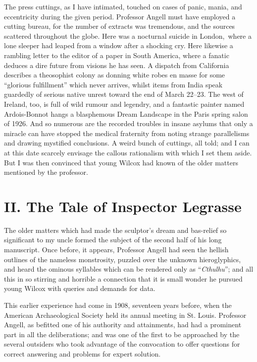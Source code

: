 The press cuttings, as I have intimated, touched on cases of panic,
mania, and eccentricity during the given period. Professor Angell must
have employed a cutting bureau, for the number of extracts was
tremendous, and the sources scattered throughout the globe. Here was a
nocturnal suicide in London,\est\ where a lone sleeper had leaped from a
window after a shocking cry. Here likewise a rambling letter to the
editor of a paper in South America, where a fanatic deduces a dire
future from visions he has seen. A dispatch from California describes a
theosophist colony as donning white robes en masse for some ``glorious
fulfillment'' which never arrives, whilst items from India speak
guardedly of serious native unrest toward the end of March 22--23.
The west of Ireland, too, is full of wild rumour and legendry, and a
fantastic painter named Ardois-Bonnot hangs a blasphemous Dream
Landscape in the Paris spring salon of 1926. And so numerous are the
recorded troubles in insane asylums that only a miracle can have stopped
the medical fraternity from noting strange parallelisms and drawing
mystified conclusions. A weird bunch of cuttings, all told; and I can at
this date scarcely envisage the callous rationalism with which I set
them aside. But I was then convinced that young Wilcox had known of the
older matters mentioned by the professor.

\chapter*{II. The Tale of Inspector Legrasse}

The older matters which had made the sculptor's dream and bas-relief so
significant to my uncle formed the subject of the second half of his
long manuscript. Once before, it appears, Professor Angell had seen the
hellish outlines of the nameless monstrosity, puzzled over the unknown
hieroglyphics, and heard the ominous syllables which can be rendered
only as ``\emph{Cthulhu}''; and all this in so stirring and horrible a
connection that it is small wonder he pursued young Wilcox with queries
and demands for data.

This earlier experience had come in 1908, seventeen years before, when
the American Archaeological Society held its annual meeting in St.
Louis. Professor Angell, as befitted one of his authority and
attainments, had had a prominent part in all the deliberations; and was
one of the first to be approached by the several outsiders who took
advantage of the convocation to offer questions for correct answering
and problems for expert solution.

